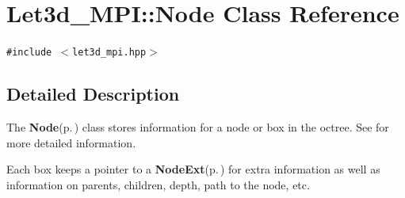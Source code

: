 \section{Let3d\_\-MPI::Node Class Reference}
\label{classLet3d__MPI_1_1Node}
{\tt \#include $<$let3d\_\-mpi.hpp$>$}



\subsection{Detailed Description}
The {\bf Node}{\rm (p.\,\pageref{classLet3d__MPI_1_1Node})} class stores information for a node or box in the octree. See for more detailed information. 

Each box keeps a pointer to a {\bf Node\-Ext}{\rm (p.\,\pageref{classLet3d__MPI_1_1NodeExt})} for extra information as well as information on parents, children, depth, path to the node, etc. 



